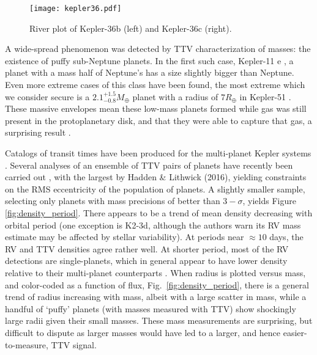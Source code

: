 \documentclass[graybox,natbib,nosecnum]{svmult}
\begin{document}
\begin{figure}
\centerline{
\texttt{[image: kepler36.pdf]}}
\caption{River plot of Kepler-36b (left) and Kepler-36c (right).}
\label{fig:kep36}
\end{figure}


A wide-spread phenomenon was detected by TTV characterization of masses: the existence of puffy sub-Neptune planets.  In the first such case, Kepler-11 e \citep{2011Natur.470...53L}, a planet with a mass half of Neptune's has a size slightly bigger than Neptune.  Even more extreme cases of this class have been found, the most extreme which we consider secure is a $2.1^{+1.5}_{-0.8} M_\oplus$ planet with a radius of $7 R_\oplus$ in Kepler-51 \citep{2014ApJ...783...53M}.  These massive envelopes mean these low-mass planets formed while gas was still present in the protoplanetary disk, and that they were able to capture that gas, a surprising result \citep[e.g.][]{2016ApJ...817...90L,2016ApJ...825...29G}. 
 

Catalogs of transit times have been produced for the multi-planet Kepler systems \citep{2013ApJS..208...16M,Rowe2015,2016ApJS..225....9H}. Several analyses of an ensemble of TTV pairs of planets have recently been carried out \citep{2014ApJ...787...80H,2013ApJS..208...22X,2014ApJS..210...25X,2016ApJ...820...39J}, with the largest by Hadden \& Lithwick (2016), yielding constraints on the RMS eccentricity of the population of planets.  A slightly smaller sample, selecting only planets with mass precisions of better than $3-\sigma$, yields Figure \ref{fig:density_period}.  There appears to be a trend of mean density decreasing with orbital period (one exception is K2-3d, although the authors warn its RV mass estimate may be affected by stellar variability).  At periods near $\approx 10$ days, the RV and TTV densities agree rather well.  At shorter period, most of the RV detections are single-planets, which in general appear to have lower density relative to their multi-planet counterparts \citep{Steffen2016}.  When radius is plotted versus mass, and color-coded as a function of flux, Fig.\ \ref{fig:density_period}, there is a general trend of radius increasing with mass, albeit with a large scatter in mass, while a handful of `puffy' planets (with masses measured with TTV) show shockingly large radii given their small masses.  These mass measurements are surprising, but difficult to dispute as larger masses would have led to a larger, and hence easier-to-measure, TTV signal.
\end{document}
